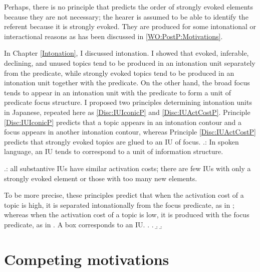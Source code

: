 Perhaps, there is no principle that predicts the order of strongly evoked elements because they are not necessary;
the hearer is assumed to be able to identify the referent
because it is strongly evoked.
They are produced for some intonational or interactional reasons
as has been discussed in \ref{WO:PostP:Motivations}.

In Chapter \ref{Intonation},
I discussed intonation.
I showed that
evoked, inferable, declining, and unused topics tend to be produced in an intonation unit separately from the predicate,
while strongly evoked topics tend to be produced in an intonation unit together with the predicate.
On the other hand,
the broad focus tends to appear in an intonation unit with the predicate
to form a unit of predicate focus structure.
I proposed two principles determining intonation units in Japanese,
repeated here as \ref{Disc:IUIconicP} and \ref{Disc:IUActCostP}.
Principle \ref{Disc:IUIconicP} predicts that
a topic appears in an intonation contour and a focus appears in another intonation contour,
whereas Principle \ref{Disc:IUActCostP} predicts that
strongly evoked topics are glued to an IU of focus.
%
\ex.\label{Disc:IUIconicP}:
	In spoken language,
	an IU tends to correspond to a unit of information structure.

\ex.\label{Disc:IUActCostP}:
     all substantive IUs have similar activation costs;
     there are few IUs with only a strongly evoked element or
     those with too many new elements.

To be more precise, these principles predict that
when the activation cost of a topic is high,
it is separated intonationally from the focus predicate, as in \Next[a];
whereas when the activation cost of a topic is low,
it is produced with the focus predicate, as in \Next[b-c].
A box corresponds to an IU.
%
\ex.
 \a.  
 \b. 
 \b. 

\section{Competing motivations}\label{Disc:CompMotivations}

